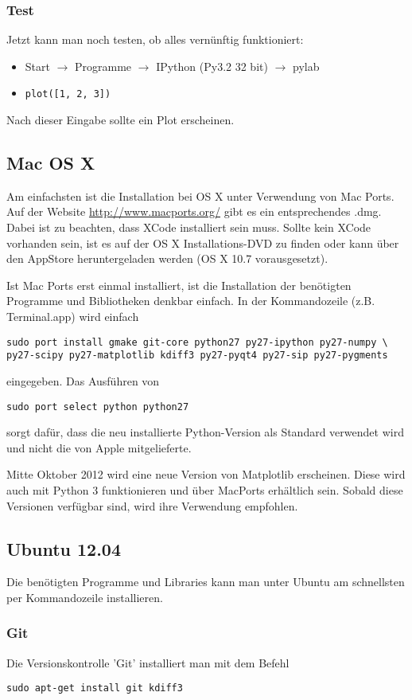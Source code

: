 \subsubsection{Test}
Jetzt kann man noch testen, ob alles vernünftig funktioniert:
\begin{itemize}
  \item Start $\rightarrow$ Programme $\rightarrow$ IPython (Py3.2 32 bit) $\rightarrow$ pylab
  \item \texttt{plot([1, 2, 3])}
\end{itemize}
Nach dieser Eingabe sollte ein Plot erscheinen.

\subsection{Mac OS X}
Am einfachsten ist die Installation bei OS X unter Verwendung von Mac Ports.
Auf der Website \url{http://www.macports.org/} gibt es ein entsprechendes .dmg.
Dabei ist zu beachten, dass XCode installiert sein muss. Sollte kein XCode vorhanden sein, ist es auf der OS X Installations-DVD zu finden oder kann über den AppStore heruntergeladen werden (OS X 10.7 vorausgesetzt).

Ist Mac Ports erst einmal installiert, ist die Installation der benötigten Programme und Bibliotheken denkbar einfach.
In der Kommandozeile (z.B. Terminal.app) wird einfach
\begin{verbatim}
sudo port install gmake git-core python27 py27-ipython py27-numpy \
py27-scipy py27-matplotlib kdiff3 py27-pyqt4 py27-sip py27-pygments
\end{verbatim}
eingegeben.
Das Ausführen von
\begin{verbatim}
sudo port select python python27
\end{verbatim}
sorgt dafür, dass die neu installierte Python-Version als Standard verwendet wird und nicht die von Apple mitgelieferte.

Mitte Oktober 2012 wird eine neue Version von Matplotlib erscheinen. Diese wird auch mit Python 3 funktionieren und über MacPorts erhältlich sein. Sobald diese Versionen verfügbar sind, wird ihre Verwendung empfohlen.

\subsection{Ubuntu 12.04}
Die benötigten Programme und Libraries kann man unter Ubuntu am schnellsten per Kommandozeile installieren.

\subsubsection{Git}
Die Versionskontrolle 'Git' installiert man mit dem Befehl
\begin{verbatim}
sudo apt-get install git kdiff3
\end{verbatim}

